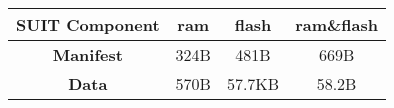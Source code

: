 \documentclass{standalone}
\begin{document}
\centering
\begin{tabular}[t]{cccc}
    \hline\hline
    \textbf{SUIT Component} & ram  & flash  & ram\&flash \\ \hline
    \textbf{Manifest}       & 324B & 481B   & 669B       \\
    \textbf{Data}           & 570B & 57.7KB & 58.2B      \\ \hline
\end{tabular}%
\end{document}
